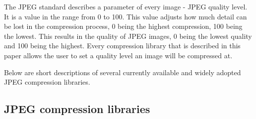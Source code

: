 \documentclass[12pt]{article}
\begin{document}
The JPEG standard describes a parameter of every image - JPEG quality level. It is a value in the range from 0 to 100. This value adjusts how much detail can be lost in the compression process, 0 being the highest compression, 100 being the lowest. This results in the quality of JPEG images, 0 being the lowest quality and 100 being the highest. Every compression library that is described in this paper allows the user to set a quality level an image will be compressed at.

Below are short descriptions of several currently available and widely adopted JPEG compression libraries.

\subsection{JPEG compression libraries}
\end{document}

